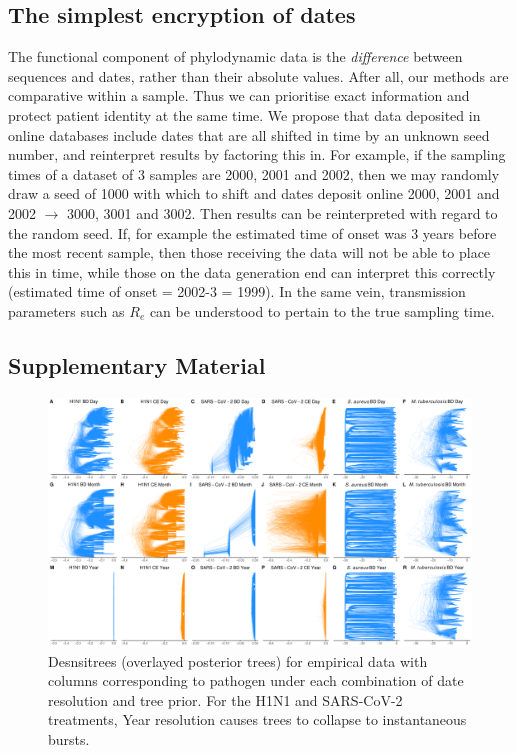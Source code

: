 \documentclass{article}
\begin{document}
\begin{spacing}{1.5}
\subsection*{The simplest encryption of dates}
The functional component of phylodynamic data is the \emph{difference} between sequences and dates, rather than their absolute values. After all, our methods are comparative within a sample. Thus we can prioritise exact information and protect patient identity at the same time. We propose that data deposited in online databases include dates that are all shifted in time by an unknown seed number, and reinterpret results by factoring this in. For example, if the sampling times of a dataset of 3 samples are 2000, 2001 and 2002, then we may randomly draw a seed of 1000 with which to shift and dates deposit online 2000, 2001 and 2002 $\rightarrow$ 3000, 3001 and 3002. Then results can be reinterpreted with regard to the random seed. If, for example the estimated time of onset was 3 years before the most recent sample, then those receiving the data will not be able to place this in time, while those on the data generation end can interpret this correctly (estimated time of onset = 2002-3 = 1999). In the same vein, transmission parameters such as $R_e$ can be understood to pertain to the true sampling time.

\end{spacing}




\subsection*{Supplementary Material}

\renewcommand{\thefigure}{S\arabic{figure}}
\setcounter{figure}{0}

\begin{figure}[h!]
    \centering
    \includegraphics[width=\textwidth]{empirical_densitrees.pdf}
    \caption{Desnsitrees (overlayed posterior trees) for empirical data with columns corresponding to pathogen under each combination of date resolution and tree prior. For the H1N1 and SARS-CoV-2 treatments, Year resolution causes trees to collapse to instantaneous bursts.}
    \label{fig:densitree}
\end{figure}
\end{document}
